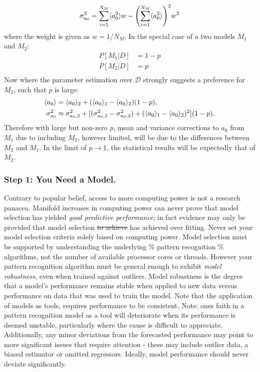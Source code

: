 \documentclass[10pt]{article}[draft]
\begin{document}
\begin{equation}
	\begin{split}
	\sigma_{a_0}^2 =  \sum_{i=1}^{N_M}  \inn{a_0^2} w - \Biggl( \sum_{i=1}^{N_M} \inn{a_0^2} \Biggr)^2 w^2
	\end{split}
\end{equation}
where the weight is given as $w = {1}/{N_M}$. In the special case of a two models $M_1$ and $M_2$:
\begin{equation}
	\begin{split}
	P[M_1|D]  & = 1 - p \\
	P[M_2|D]  & =  p \\
	\end{split}
\end{equation}
Now where the parameter estimation over $\mathcal{D}$ strongly suggests a preference for $M_2$, such that $p$ is large:
\begin{equation}
	\begin{split}
		\inn{a_0} & = \inn{a_0}_2 + ( \inn{a_0}_1 - \inn{a_0}_2) (1- p), \\
		\sigma^2_{a_0} & \approx \sigma^2_{a_0,2} +[ (\sigma^2_{a_0,1} - \sigma^2_{a_0,2})   + ( \inn{a_0}_1 - \inn{a_0}_2)^2 ](1- p),
	\end{split}
\end{equation}
Therefore with large but non-zero $p$, mean and variance corrections to $a_0$ from $M_1$ due to including $M_2$, however limited, will be due to the differences between $M_2$ and $M_1$. In the limit of $p \rightarrow 1$, the statistical results will be expectedly that of $M_2$.
\vspace{0.25in}
\subsubsection*{Step 1: You Need a Model.}


Contrary to popular belief, access to more computing power is not a research panacea. Manifold increases in computing power can never prove that model selection has yielded \emph{good predictive performance}; in fact evidence may only be provided that model selection \st{to achieve} has achieved over fitting. Never set your model selection criteria solely based on computing power. Model selection must be supported by understanding the underlying  \% pattern recognition \% algorithms, not the number of available processor cores or threads. However your pattern recognition algorithm  must be general enough to exhibit \emph{model robustness}, even when trained against outliers. Model robustness is the degree that a model’s performance remains stable when applied to new data versus performance on data that was used to train the model.  Note that the application of models as tools, requires performance to be consistent.  Note: ones faith in a pattern recognition model as a tool will deteriorate when its performance is deemed unstable, particularly where the cause is difficult to appreciate. Additionally, any minor deviations from the forecasted performance may point to more significant issues that require attention - these may include outlier data, a biased estimator or omitted regressors. Ideally, model performance should never deviate significantly.     
\end{document}
